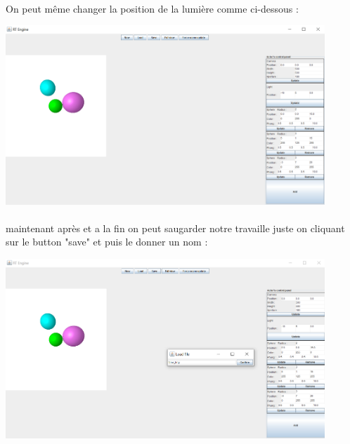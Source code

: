 \documentclass[12pt]{article}
\begin{document}
	    \paragraph{}
            On peut même changer la position de la lumière comme ci-dessous : 
		        \begin{center}
	    	    \includegraphics[width=0.9\textwidth]{./images/light.png}
			    \end{center}
			
		\paragraph{}
            maintenant après et a la fin on peut saugarder notre travaille juste on cliquant sur le button "save" et puis le donner un nom :
		        \begin{center}
	    	    \includegraphics[width=0.9\textwidth]{./images/save.png}
			    \end{center}	
		\newpage
\end{document}
